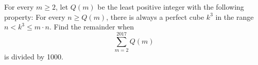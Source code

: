 For every $m \geq 2$, let $Q(m)$ be the least positive integer with the following property: For every $n \geq Q(m)$, there is always a perfect cube $k^3$ in the range $n < k^3 \leq m \cdot n$. Find the remainder when
\[ \sum_{m = 2}^{2017} Q(m) \]is divided by 1000.